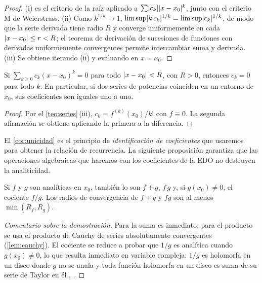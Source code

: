 \begin{proof}
(i) es el criterio de la raíz aplicado a $\sum\lvert c_k\rvert\lvert x-x_0\rvert^k$, junto
con el criterio M de Weierstrass. (ii) Como $k^{1/k}\to1$,
$\limsup\lvert k\,c_k\rvert^{1/k}=\limsup\lvert c_k\rvert^{1/k}$, de modo que la serie
derivada tiene radio $R$ y converge uniformemente en cada
$\lvert x-x_0\rvert\le r<R$; el teorema de derivación de sucesiones de funciones
con derivadas uniformemente convergentes permite intercambiar suma y
derivada. (iii) Se obtiene iterando (ii) y evaluando en $x=x_0$.
\end{proof}

\begin{corolario}\label{cor:unicidad}
Si $\sum_{k\ge0}c_k(x-x_0)^k=0$ para todo $\lvert x-x_0\rvert<R$, con $R>0$, entonces
$c_k=0$ para todo $k$. En particular, si dos series de potencias coinciden en
un entorno de $x_0$, sus coeficientes son iguales uno a uno.
\end{corolario}

\begin{proof}
Por el \cref{teo:series}\,(iii), $c_k=f^{(k)}(x_0)/k!$ con $f\equiv0$.
La segunda afirmación se obtiene aplicando la primera a la diferencia.
\end{proof}

El \cref{cor:unicidad} es el principio de \emph{identificación de
coeficientes} que usaremos para obtener la relación de recurrencia. La
siguiente proposición garantiza que las operaciones algebraicas que haremos
con los coeficientes de la EDO no destruyen la analiticidad.

\begin{proposicion}\label{prop:algebra}
Si $f$ y $g$ son analíticas en $x_0$, también lo son $f+g$, $f\,g$ y, si
$g(x_0)\neq0$, el cociente $f/g$. Los radios de convergencia de $f+g$ y $fg$
son al menos $\min(R_f,R_g)$.
\end{proposicion}

\begin{proof}[Comentario sobre la demostración]
Para la suma es inmediato; para el producto se usa el producto de Cauchy de
series absolutamente convergentes (\cref{lem:cauchy}). El cociente se reduce
a probar que $1/g$ es analítica cuando $g(x_0)\neq0$, lo que resulta
inmediato en variable compleja: $1/g$ es holomorfa en un disco donde $g$ no
se anula y toda función holomorfa en un disco es suma de su serie de Taylor
en él \cite[cap.~4]{AHLFORS}, \cite[§1.1]{KRANTZ}.
\end{proof}

